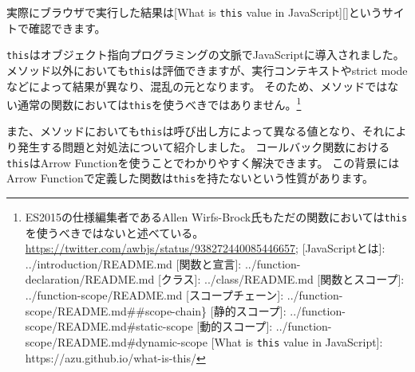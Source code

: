 実際にブラウザで実行した結果は{[}What is \texttt{this}
value in JavaScript{]}{[}{]}というサイトで確認できます。

\texttt{this}はオブジェクト指向プログラミングの文脈でJavaScriptに導入されました。
メソッド以外においても\texttt{this}は評価できますが、実行コンテキストやstrict
modeなどによって結果が異なり、混乱の元となります。
そのため、メソッドではない通常の関数においては\texttt{this}を使うべきではありません。\footnote{ES2015の仕様編集者であるAllen
  Wirfs-Brock‏氏もただの関数においては\texttt{this}を使うべきではないと述べている。\url{https://twitter.com/awbjs/status/938272440085446657};
  {[}JavaScriptとは{]}: ../introduction/README.md {[}関数と宣言{]}:
  ../function-declaration/README.md {[}クラス{]}: ../class/README.md
  {[}関数とスコープ{]}: ../function-scope/README.md
  {[}スコープチェーン{]}: ../function-scope/README.md\#\#scope-chain\}
  {[}静的スコープ{]}: ../function-scope/README.md\#static-scope
  {[}動的スコープ{]}: ../function-scope/README.md\#dynamic-scope {[}What
  is \texttt{this} value in JavaScript{]}:
  https://azu.github.io/what-is-this/}

また、メソッドにおいても\texttt{this}は呼び出し方によって異なる値となり、それにより発生する問題と対処法について紹介しました。
コールバック関数における\texttt{this}はArrow
Functionを使うことでわかりやすく解決できます。 この背景にはArrow
Functionで定義した関数は\texttt{this}を持たないという性質があります。
